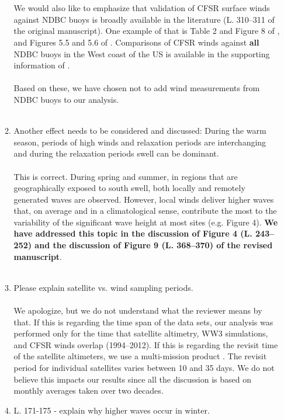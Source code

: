 \documentclass{article}
\begin{document}
\begin{enumerate}
\begin{enumerate}
{\\\\
We would also like to emphasize that validation of CFSR surface winds against NDBC buoys is broadly available in the literature (L. 310--311 of the original manuscript). One example of that is Table 2 and Figure 8 of \cite{chawla2013validation}, and Figures 5.5 and 5.6 of \cite{splinder2011initial}. Comparisons of CFSR winds against \textbf{all} NDBC buoys in the West coast of the US is available in the supporting information of \cite{chawla2013validation}.
\\\\
Based on these, we have chosen not to add wind measurements from NDBC buoys to our analysis.}
\\\\
\item Another effect needs to be considered and discussed: During the warm season, periods of high winds and relaxation periods are interchanging and during the relaxation periods swell can be dominant.
\\\\
{\color{blue} This is correct. During spring and summer, in regions that are 
geographically exposed to south swell, both locally and remotely generated waves are observed. However, local winds deliver higher waves that, on average and in a climatological sense, contribute the most to the variability of the significant wave height at most sites (e.g. Figure 4). 
\textbf{We have addressed this topic in the discussion of Figure 4 (L. 243--252) and the discussion of Figure 9 (L. 368--370) of the revised manuscript}. 
}
\\\\
\item Please explain satellite vs. wind sampling periods.
\\\\
{\color{blue} We apologize, but we do not understand what the reviewer means by that. If this is
regarding the time span of the data sets, our analysis was performed only for the time that satellite altimetry, WW3 simulations, and CFSR winds overlap (1994--2012). If this is regarding the revisit time of the satellite altimeters, we use a multi-mission product \citep{queffeulou2004long}. The revisit period for individual satellites varies between 10 and 35 days. We do not believe this impacts our results since all the discussion is based on monthly averages taken over two decades.}
\\
\item L. 171-175 - explain why higher waves occur in winter.

\end{enumerate}
\end{enumerate}
\end{document}

